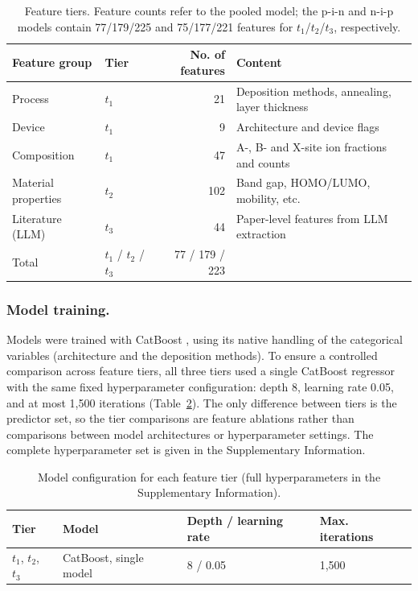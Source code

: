 \documentclass[3p]{elsarticle}
\begin{document}
\begin{table}[t]
\centering\small
\caption{Feature tiers. Feature counts refer to the pooled model; the p-i-n and n-i-p models contain 77/179/225 and 75/177/221 features for $t_1$/$t_2$/$t_3$, respectively.}
\label{tab:tiertable}
\begin{tabular}{llrl}
\toprule
Feature group & Tier & No. of features & Content \\
\midrule
Process & $t_1$ & 21 & Deposition methods, annealing, layer thickness \\
Device & $t_1$ & 9 & Architecture and device flags \\
Composition & $t_1$ & 47 & A-, B- and X-site ion fractions and counts \\
Material properties & $t_2$ & 102 & Band gap, HOMO/LUMO, mobility, etc. \\
Literature (LLM) & $t_3$ & 44 & Paper-level features from LLM extraction \\
\midrule
Total & $t_1$ / $t_2$ / $t_3$ & 77 / 179 / 223 & \\
\bottomrule
\end{tabular}
\end{table}

\subsubsection{Model training.}
\label{sec:models}
Models were trained with CatBoost \cite{prokhorenkova2018catboost}, using its native handling of the categorical variables (architecture and the deposition methods). To ensure a controlled comparison across feature tiers, all three tiers used a single CatBoost regressor with the same fixed hyperparameter configuration: depth 8, learning rate 0.05, and at most 1,500 iterations (Table~\ref{tab:config}). The only difference between tiers is the predictor set, so the tier comparisons are feature ablations rather than comparisons between model architectures or hyperparameter settings. The complete hyperparameter set is given in the Supplementary Information.

\begin{table}[t]
\centering\small
\caption{Model configuration for each feature tier (full hyperparameters in the Supplementary Information).}
\label{tab:config}
\begin{tabular}{llll}
\toprule
Tier & Model & Depth / learning rate & Max. iterations \\
\midrule
$t_1$, $t_2$, $t_3$ & CatBoost, single model & 8 / 0.05 & 1,500 \\
\bottomrule
\end{tabular}
\end{table}
\end{document}
